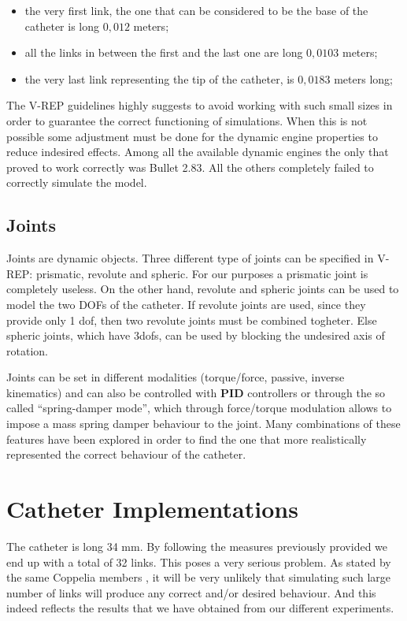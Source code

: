 \documentclass[conference,12pt]{IEEEtran}
\begin{document}
\begin{itemize}
	\item the very first link, the one that can be considered to be the base of the catheter is long $0,012$ meters;
	\item all the links in between the first and the last one are long $0,0103$ meters;
	\item the very last link representing the tip of the catheter, is $0,0183$ meters long;
\end{itemize}

The V-REP guidelines highly suggests to avoid working with such small sizes in order to guarantee the correct functioning of simulations. When this is not possible some adjustment must be done for the dynamic engine properties to reduce indesired effects. Among all the available dynamic engines the only that proved to work correctly was Bullet 2.83. All the others completely failed to correctly simulate the model.

\subsection{Joints}

Joints are dynamic objects. Three different type of joints can be specified in V-REP: prismatic, revolute and spheric. For our purposes a prismatic joint is completely useless. On the other hand, revolute and spheric joints can be used to model the two DOFs of the catheter. If revolute joints are used, since they provide only 1 dof, then two revolute joints must be combined togheter. Else spheric joints, which have 3dofs, can be used by blocking the undesired axis of rotation.

Joints can be set in different modalities (torque/force, passive, inverse kinematics) and can also be controlled with \textbf{PID} controllers or through the so called “spring-damper mode”, which through force/torque modulation allows to impose a mass spring damper behaviour to the joint. Many combinations of these features have been explored in order to find the one that more realistically represented the correct behaviour of the catheter.

\section{Catheter Implementations}

The catheter is long 34 mm. By following the measures previously provided we end up with a total of 32 links. This poses a very serious problem. As stated by the same Coppelia members \cite{coppelia1}, it will be very unlikely that simulating such large number of links will produce any correct and/or desired behaviour. And this indeed reflects the results that we have obtained from our different experiments.
\end{document}
